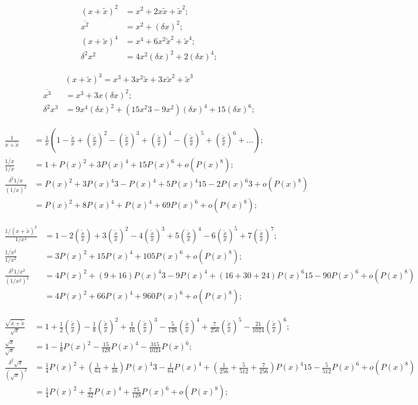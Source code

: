 \documentclass[twoside]{article}
\numberwithin{equation}{section}
\begin{document}
\begin{align*}
(x + \tilde{x})^2 &= x^2 + 2 x \tilde{x} + \tilde{x}^2; \\
\overline{x^2} &= x^2 + (\delta x)^2; \\
(x + \tilde{x})^4 &= x^4 + 6 x^2 \tilde{x}^2 + \tilde{x}^4; \\
\delta^2 x^2 &= 4 x^2 (\delta x)^2 + 2 (\delta x)^4;
\end{align*}

\begin{align*}
& (x + \tilde{x})^3 = x^3 + 3 x^2 \tilde{x} + 3 x \tilde{x}^2 + \tilde{x}^3 \\
\overline{x^3} &= x^3 + 3 x (\delta x)^2; \\
\delta^2 x^3 &= 9 x^4  (\delta x)^2 +  (15 x^2 3 - 9 x^2) (\delta x)^4 + 15 (\delta x)^6;
\end{align*}

\begin{align*}
\frac{1}{x + \tilde{x}} &= \frac{1}{x} \left(1 - \frac{\tilde{x}}{x} + (\frac{\tilde{x}}{x})^2 - (\frac{\tilde{x}}{x})^3 + (\frac{\tilde{x}}{x})^4 
		 - (\frac{\tilde{x}}{x})^5 + (\frac{\tilde{x}}{x})^6 + \dots \right); \\
\frac{\overline{1/x}}{1/x} &= 1 + P(x)^2 + 3 P(x)^4 + 15 P(x)^6 + o(P(x)^8); \\
\frac{\delta^2 1/x}{(1/x)^2} &= P(x)^2 + 3 P(x)^4 3 - P(x)^4  + 5 P(x)^4 15 - 2 P(x)^6 3 + o(P(x)^8) \\
	&= P(x)^2 + 8 P(x)^4 + P(x)^4 + 69 P(x)^6 + o(P(x)^8) ;
\end{align*}

\begin{align*}
\frac{1/(x + \tilde{x})^2}{1/x^2} &= 1 - 2 (\frac{\tilde{x}}{x}) + 3 (\frac{\tilde{x}}{x})^2 -4  (\frac{\tilde{x}}{x})^3 
		+5 (\frac{\tilde{x}}{x})^4 - 6 (\frac{\tilde{x}}{x})^5 + 7 (\frac{\tilde{x}}{x})^7; \\
\frac{\overline{1/x^2}}{1/x^2} &= 3 P(x)^2 + 15 P(x)^4 + 105 P(x)^6 + o(P(x)^8); \\
\frac{\delta^2 1/x^2}{(1/x^2)^2} &= 4 P(x)^2 + (9 + 16) P(x)^4 3 - 9 P(x)^4 + (16 + 30+ 24) P(x)^6 15 - 90 P(x)^6 + o(P(x)^8)  \\
	&= 4 P(x)^2 + 66 P(x)^4 + 960 P(x)^6 + o(P(x)^8);
\end{align*}

\begin{align*}
\frac{\sqrt{x + \tilde{x}}}{\sqrt{x}} &= 1 + \frac{1}{2} (\frac{\tilde{x}}{x}) - \frac{1}{8} (\frac{\tilde{x}}{x})^2 + \frac{1}{16} (\frac{\tilde{x}}{x})^3 
		- \frac{5}{128} (\frac{\tilde{x}}{x})^4 + \frac{7}{256} (\frac{\tilde{x}}{x})^5 - \frac{21}{1024} (\frac{\tilde{x}}{x})^6; \\
\frac{\overline{\sqrt{x}}}{\sqrt{x}} &= 1 - \frac{1}{8} P(x)^2 - \frac{15}{128} P(x)^4 - \frac{315}{1024} P(x)^6; \\
\frac{\delta^2 \sqrt{x}}{(\sqrt{x})^2} &= \frac{1}{4} P(x)^2 + (\frac{1}{64} + \frac{1}{16}) P(x)^4 3 - \frac{1}{64} P(x)^4  
		+ (\frac{1}{256} + \frac{5}{512} + \frac{7}{256}) P(x)^4 15 - \frac{5}{512} P(x)^6 + o(P(x)^8) \\
	&= \frac{1}{4} P(x)^2 + \frac{7}{32} P(x)^4 + \frac{75}{128} P(x)^6 + o(P(x)^8) ;
\end{align*}
\end{document}
